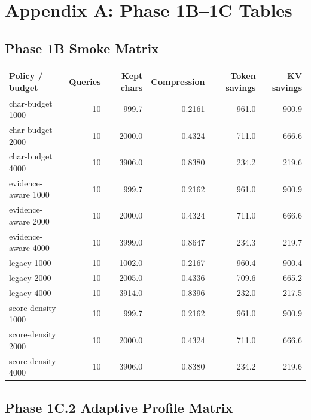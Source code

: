\section{Appendix A: Phase 1B--1C Tables}

\subsection{Phase 1B Smoke Matrix}

\begin{longtable}{l r r r r r}
\toprule
Policy / budget & Queries & Kept chars & Compression & Token savings & KV savings \\
\midrule
char-budget 1000 & 10 & 999.7 & 0.2161 & 961.0 & 900.9 \\
char-budget 2000 & 10 & 2000.0 & 0.4324 & 711.0 & 666.6 \\
char-budget 4000 & 10 & 3906.0 & 0.8380 & 234.2 & 219.6 \\
evidence-aware 1000 & 10 & 999.7 & 0.2162 & 961.0 & 900.9 \\
evidence-aware 2000 & 10 & 2000.0 & 0.4324 & 711.0 & 666.6 \\
evidence-aware 4000 & 10 & 3999.0 & 0.8647 & 234.3 & 219.7 \\
legacy 1000 & 10 & 1002.0 & 0.2167 & 960.4 & 900.4 \\
legacy 2000 & 10 & 2005.0 & 0.4336 & 709.6 & 665.2 \\
legacy 4000 & 10 & 3914.0 & 0.8396 & 232.0 & 217.5 \\
score-density 1000 & 10 & 999.7 & 0.2162 & 961.0 & 900.9 \\
score-density 2000 & 10 & 2000.0 & 0.4324 & 711.0 & 666.6 \\
score-density 4000 & 10 & 3906.0 & 0.8380 & 234.2 & 219.6 \\
\bottomrule
\end{longtable}

\subsection{Phase 1C.2 Adaptive Profile Matrix}

